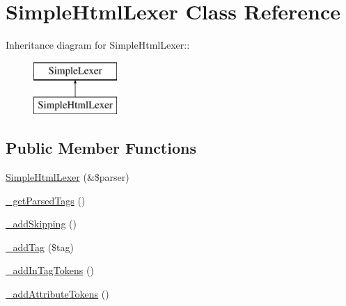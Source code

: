 \hypertarget{class_simple_html_lexer}{
\section{SimpleHtmlLexer Class Reference}
\label{class_simple_html_lexer}
}
Inheritance diagram for SimpleHtmlLexer::\begin{figure}[H]
\begin{center}
\leavevmode
\includegraphics[height=2cm]{class_simple_html_lexer}
\end{center}
\end{figure}
\subsection*{Public Member Functions}
\begin{DoxyCompactItemize}
\item 
\hyperlink{class_simple_html_lexer_a75484f1b502fb907157326938b7709c6}{SimpleHtmlLexer} (\&\$parser)
\item 
\hyperlink{class_simple_html_lexer_aa52514ac1aa91a058c2aba5f8c5ee42e}{\_\-getParsedTags} ()
\item 
\hyperlink{class_simple_html_lexer_ab79435c67c062d6ac87e977cf69f4079}{\_\-addSkipping} ()
\item 
\hyperlink{class_simple_html_lexer_a75ea520f6f309214e4dbd26579ef8e41}{\_\-addTag} (\$tag)
\item 
\hyperlink{class_simple_html_lexer_a1a2cb51b90abd02362c71ce93f220e58}{\_\-addInTagTokens} ()
\item 
\hyperlink{class_simple_html_lexer_a4cd292408994d7af7c2610f3c95798ca}{\_\-addAttributeTokens} ()
\end{DoxyCompactItemize}


